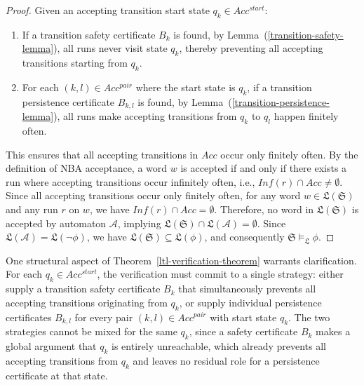 \begin{proof}
  Given an accepting transition start state $q_k \in Acc^{start}$:
  \begin{enumerate}
    \item If a transition safety certificate $B_k$ is found, by Lemma~(\ref{transition-safety-lemma}), all runs never visit state $q_k$, thereby preventing all accepting transitions starting from $q_k$.
    \item For each $(k, l) \in Acc^{pair}$ where the start state is $q_k$, if a transition persistence certificate $B_{k,l}$ is found, by Lemma~(\ref{transition-persistence-lemma}), all runs make accepting transitions from $q_k$ to $q_l$ happen finitely often.
  \end{enumerate}
  This ensures that all accepting transitions in $Acc$ occur only finitely often. By the definition of NBA acceptance, a word $w$ is accepted if and only if there exists a run where accepting transitions occur infinitely often, i.e., $\mathit{Inf}(r) \cap Acc \neq \emptyset$. Since all accepting transitions occur only finitely often, for any word $w \in \mathfrak{L}(\mathfrak{S})$ and any run $r$ on $w$, we have $\mathit{Inf}(r) \cap Acc = \emptyset$. Therefore, no word in $\mathfrak{L}(\mathfrak{S})$ is accepted by automaton $\mathcal{A}$, implying $\mathfrak{L}(\mathfrak{S}) \cap \mathfrak{L}(\mathcal{A}) = \emptyset$. Since $\mathfrak{L}(\mathcal{A}) = \mathfrak{L}(\neg \phi)$, we have $\mathfrak{L}(\mathfrak{S}) \subseteq \mathfrak{L}(\phi)$, and consequently $\mathfrak{S} \models_{\mathfrak{L}} \phi$.
\end{proof}

One structural aspect of Theorem~\ref{ltl-verification-theorem} warrants clarification. For each $q_k \in Acc^{start}$, the verification must commit to a single strategy: either supply a transition safety certificate $B_k$ that simultaneously prevents all accepting transitions originating from $q_k$, or supply individual persistence certificates $B_{k,l}$ for every pair $(k, l) \in Acc^{pair}$ with start state $q_k$. The two strategies cannot be mixed for the same $q_k$, since a safety certificate $B_k$ makes a global argument that $q_k$ is entirely unreachable, which already prevents all accepting transitions from $q_k$ and leaves no residual role for a persistence certificate at that state.

